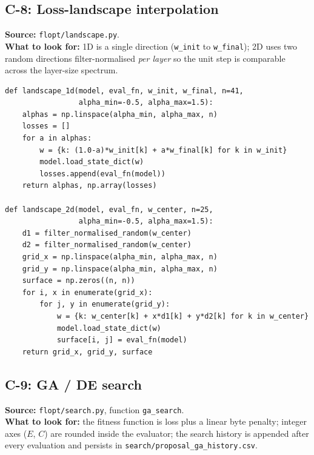 \subsection{C-8: Loss-landscape interpolation}
\textbf{Source:} \texttt{flopt/landscape.py}.\\
\textbf{What to look for:} 1D is a single direction
(\texttt{w\_init} to \texttt{w\_final}); 2D uses two random
directions filter-normalised \emph{per layer} so the unit step
is comparable across the layer-size spectrum.

\begin{lstlisting}
def landscape_1d(model, eval_fn, w_init, w_final, n=41,
                 alpha_min=-0.5, alpha_max=1.5):
    alphas = np.linspace(alpha_min, alpha_max, n)
    losses = []
    for a in alphas:
        w = {k: (1.0-a)*w_init[k] + a*w_final[k] for k in w_init}
        model.load_state_dict(w)
        losses.append(eval_fn(model))
    return alphas, np.array(losses)

def landscape_2d(model, eval_fn, w_center, n=25,
                 alpha_min=-0.5, alpha_max=1.5):
    d1 = filter_normalised_random(w_center)
    d2 = filter_normalised_random(w_center)
    grid_x = np.linspace(alpha_min, alpha_max, n)
    grid_y = np.linspace(alpha_min, alpha_max, n)
    surface = np.zeros((n, n))
    for i, x in enumerate(grid_x):
        for j, y in enumerate(grid_y):
            w = {k: w_center[k] + x*d1[k] + y*d2[k] for k in w_center}
            model.load_state_dict(w)
            surface[i, j] = eval_fn(model)
    return grid_x, grid_y, surface
\end{lstlisting}

\subsection{C-9: GA / DE search}
\textbf{Source:} \texttt{flopt/search.py}, function
\texttt{ga\_search}.\\
\textbf{What to look for:} the fitness function is loss plus a
linear byte penalty; integer axes ($E$, $C$) are rounded inside the
evaluator; the search history is appended after every evaluation
and persists in \texttt{search/proposal\_ga\_history.csv}.

